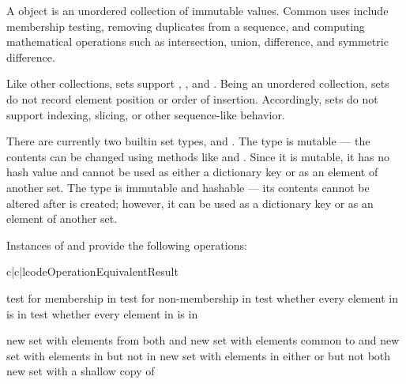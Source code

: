 A  object is an unordered collection of immutable values.
Common uses include membership testing, removing duplicates from a sequence,
and computing mathematical operations such as intersection, union, difference,
and symmetric difference.

Like other collections, sets support ,
, and .  Being an
unordered collection, sets do not record element position or order of
insertion.  Accordingly, sets do not support indexing, slicing, or
other sequence-like behavior.     

There are currently two builtin set types,  and .
The  type is mutable --- the contents can be changed using methods
like  and .  Since it is mutable, it has no
hash value and cannot be used as either a dictionary key or as an element of
another set.  The  type is immutable and hashable --- its
contents cannot be altered after is created; however, it can be used as
a dictionary key or as an element of another set.

Instances of  and  provide the following operations:

\begin{tableiii}{c|c|l}{code}{Operation}{Equivalent}{Result}

  \hline
         {test  for membership in }
         {test  for non-membership in }
         {test whether every element in  is in }
         {test whether every element in  is in }

  \hline
         {new set with elements from both  and }
         {new set with elements common to  and }
         {new set with elements in  but not in }
         {new set with elements in either  or  but not both}
         {new set with a shallow copy of }
\end{tableiii}

